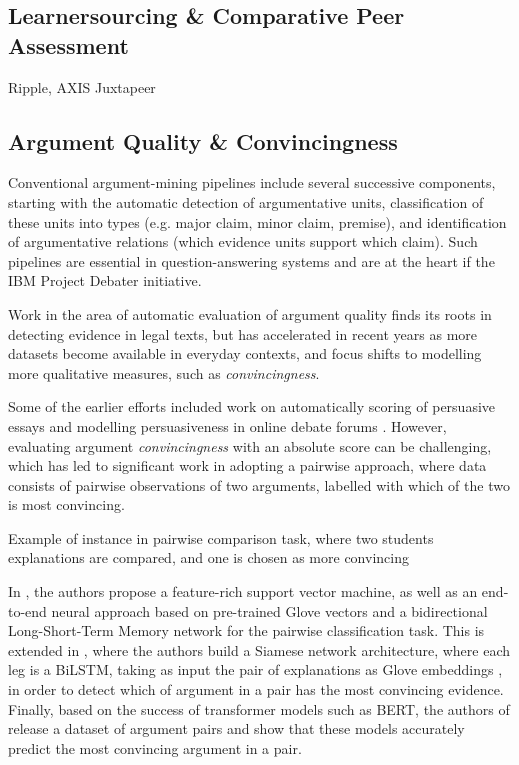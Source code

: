 \documentclass[runningheads]{llncs}
\begin{document}
\subsection{Learnersourcing \& Comparative Peer Assessment}
Ripple\cite{khosravi_ripple_2019}, AXIS\cite{williams_axis:_2016}
Juxtapeer\cite{cambre_juxtapeer:_2018}

\subsection{Argument Quality \& Convincingness}
Conventional argument-mining pipelines include several successive components, 
starting with the automatic detection of argumentative units, classification of 
these units into types (e.g. major claim, minor claim, premise), and 
identification of argumentative relations (which evidence units support which 
claim). Such pipelines are essential in question-answering systems 
\cite{lippi_argumentation_2016} and are at the heart if the IBM Project Debater 
initiative. 

Work in the area of automatic evaluation of argument quality finds its roots in 
 detecting evidence in legal texts\cite{moens_automatic_2007}, but has 
 accelerated in recent years as more datasets become 
available in everyday contexts, and focus shifts to modelling more qualitative 
measures, such as \textit{convincingness}. 

Some of the earlier efforts included work on automatically 
scoring of persuasive essays \cite{persing_end--end_2016} and modelling 
persuasiveness in online debate forums \cite{tan_winning_2016}. However, 
evaluating argument \textit{convincingness} with an absolute score can be 
challenging, which has led to significant work in adopting a pairwise approach, 
where data consists of pairwise observations of two arguments, labelled with 
which of the two is most convincing.

\begin{table}
	
	
	\caption{Example of instance in pairwise comparison task, where two 
	students explanations are compared, and one is chosen as more convincing}
	
	\label{tab:sample_obs}
\end{table}

In \cite{habernal_which_2016}, the authors propose a feature-rich support 
vector machine, as well as an end-to-end neural approach based on pre-trained 
Glove vectors and a bidirectional Long-Short-Term Memory network for the 
pairwise classification task. This is extended in \cite{gleize_are_2019}, where 
the authors build a Siamese network architecture, where each leg is a BiLSTM, 
taking as input the pair of explanations as Glove embeddings 
\cite{pennington_glove:_2014}, in order to detect which of argument in a pair 
has the most convincing evidence. Finally, based on the success of transformer 
models such as BERT\cite{devlin_bert_2018}, the authors of 
\cite{toledo_automatic_2019} 
release a dataset of argument pairs and show that these models accurately 
predict the most convincing argument in a pair.
\end{document}
